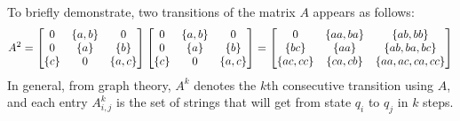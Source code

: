 \documentclass[12pt]{article}
\begin{document}
\begin{example}
  To briefly demonstrate, two transitions of the matrix \(A\) appears as
  follows:
  \begin{align*}
    A^2 =
      \begin{bmatrix}
        0 & \left\{a, b\right\} & 0 \\
        0 & \left\{a\right\} & \left\{b\right\} \\
        \left\{c\right\} & 0 & \left\{a, c\right\}
      \end{bmatrix} 
      \begin{bmatrix}
        0 & \left\{a, b\right\} & 0 \\
        0 & \left\{a\right\} & \left\{b\right\} \\
        \left\{c\right\} & 0 & \left\{a, c\right\}
      \end{bmatrix}
      =
      \begin{bmatrix}
        0 & \left\{aa, ba\right\} & \left\{ab, bb\right\} \\
        \left\{bc\right\} & \left\{aa\right\} & \left\{ab, ba, bc\right\} \\
        \left\{ac, cc\right\} & \left\{ca, cb\right\} & \left\{aa, ac, ca, cc\right\}
      \end{bmatrix}
  \end{align*}
  In general, from graph theory, \(A^k\) denotes the \(k\)th consecutive
  transition using \(A\),
  and each entry \(A^k _{i, j}\) is the set of strings that will
  get from state \(q_i\) to \(q_j\) in \(k\) steps.

\end{example}




\printbibliography
\end{document}
